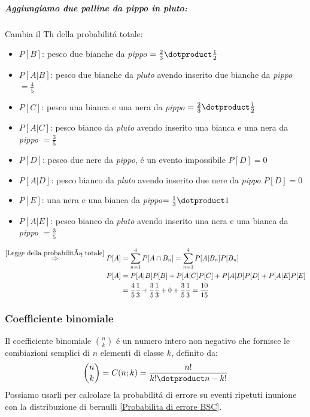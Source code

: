                 \subparagraph{Aggiungiamo due palline da \emph{pippo} in \emph{pluto}:} Cambia il Th della probabilitá totale:
                    \begin{itemize}
                        \item {$P[B]$: pesco due bianche da \emph{pippo} $= \frac{2}{3}\dotproduct \frac{1}{2} $}
                        \item {$P[A|B]$: pesco due bianche da \emph{pluto} avendo inserito due bianche da \emph{pippo}$= \frac{4}{5} $}
                        \item {$P[C]$: pesco una bianca e una nera da \emph{pippo} $= \frac{2}{3}\dotproduct \frac{1}{2} $}
                        \item {$P[A|C]$: pesco bianco da \emph{pluto} avendo inserito una bianca e una nera da \emph{pippo} $= \frac{3}{5} $}
                        \item {$P[D]$: pesco due nere da \emph{pippo}, é un evento impossibile $P[D] = 0$}
                        \item {$P[A|D]$: pesco bianco da \emph{pluto} avendo inserito due nere da \emph{pippo} $P[D] = 0$}
                        \item {$P[E]$: una nera e una bianca da \emph{pippo}$= \frac{1}{3}\dotproduct 1 $}
                        \item {$P[A|E]$: pesco bianco da \emph{pluto} avendo inserito una nera e una bianca da \emph{pippo} $= \frac{3}{5} $}
                    \end{itemize}
                    \begin{align}
                        \overset{\ref{Legge della probabilitá totale}}{\Rightarrow} P[A] &= \sum_{n=1}^{4} P[A\cap B_n] = \sum_{n=1}^{4} P[A|B_n] P[B_n] \nonumber \\
                        P[A] &= P[A|B]P[B] + P[A|C]P[C]+ P[A|D]P[D]+ P[A|E]P[E] \nonumber \\
                        &= \frac{4}{5}\frac{1}{3} + \frac{3}{5}\frac{1}{3} + 0 + \frac{3}{5}\frac{1}{3} = \frac{10}{15}  \nonumber       
                    \end{align}
        \subsubsection{Coefficiente binomiale}\label{Coefficiente binomiale}
            Il coefficiente binomiale $\binom{n}{k}$ é un numero intero non negativo che fornisce le combiazioni semplici di $n$ elementi di classe $k$,
            definito da:
            \[
                \binom{n}{k} = C(n;k) = \frac{n!}{k!\dotproduct n-k!}
            \]
            Possiamo usarli per calcolare la probabilitá di errore su eventi ripetuti inunione con la distribuzione di bernulli \ref{Probabilita di errore BSC}.
